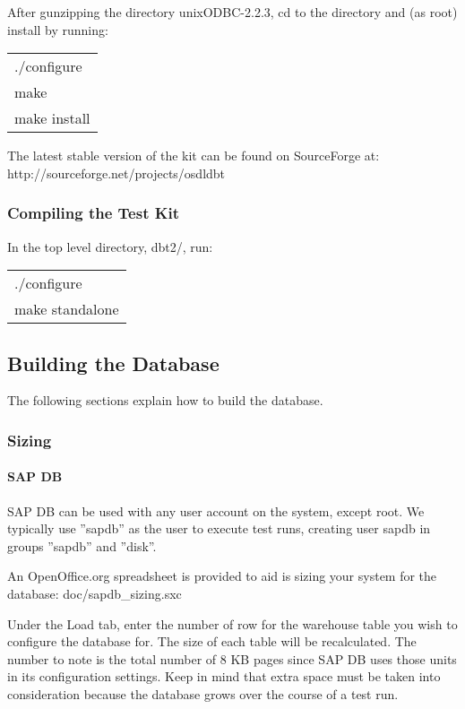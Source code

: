 \documentclass{article}
\begin{document}
After gunzipping the directory unixODBC-2.2.3, cd to the directory and (as
root) install by running: \\
\begin{tabular}[c]{l}
./configure \\
make \\
make install \\
\end{tabular}

The latest stable version of the kit can be found on SourceForge at:
http://sourceforge.net/projects/osdldbt

\subsubsection{Compiling the Test Kit}

In the top level directory, dbt2/, run: \\
\begin{tabular}[c]{l}
./configure \\
make standalone \\
\end{tabular}

\subsection{Building the Database}

The following sections explain how to build the database.

\subsubsection{Sizing}

\paragraph{SAP DB}

SAP DB can be used with any user account on the system, except root.  We
typically use ''sapdb'' as the user to execute test runs, creating user sapdb
in groups ''sapdb'' and ''disk''.

An OpenOffice.org spreadsheet is provided to aid is sizing your system for
the database: doc/sapdb\_sizing.sxc

Under the Load tab, enter the number of row for the warehouse table you wish
to configure the database for.  The size of each table will be recalculated.
The number to note is the total number of 8 KB pages since SAP DB uses those
units in its configuration settings.  Keep in mind that extra space must be
taken into consideration because the database grows over the course of a test
run.
\end{document}
